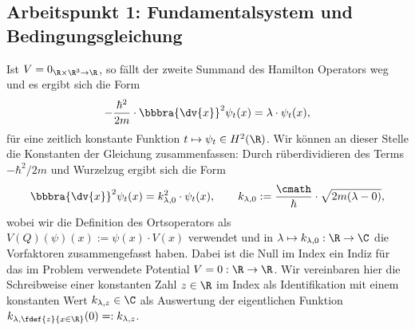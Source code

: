 \documentclass{subfiles}
\begin{document}
    \subsection{Arbeitspunkt 1: Fundamentalsystem und Bedingungsgleichung}
        Ist $V = 0_{\R\times\R^3\to\R}$, so fällt der zweite Summand des Hamilton Operators weg und es ergibt sich die Form
        \[
            -\frac{\hbar^2}{2m}\cdot\bbbra{\dv{x}}^2\psi_t(x) = \lambda\cdot\psi_t(x),
        \]
        für eine zeitlich konstante Funktion $t\mapsto \psi_t\in H^2(\R)$. 
        Wir können an dieser Stelle die Konstanten der Gleichung zusammenfassen: Durch rüberdividieren des Terms $-\hbar^2/2m$ und Wurzelzug ergibt sich die Form
        \[
            \bbbra{\dv{x}}^2\psi_t(x) = k_{\lambda,0}^2\cdot \psi_t(x),\qquad k_{\lambda,0}:=\frac{\cmath}{\hbar}\cdot\sqrt{2m(\lambda - 0)},
        \]
        wobei wir die Definition des Ortsoperators als $V(Q)(\psi)(x) := \psi(x)\cdot V(x)$ verwendet und in $\lambda\mapsto k_{\lambda,0}:\R\to\C$ die Vorfaktoren zusammengefasst haben. Dabei ist die Null im Index ein Indiz für das im Problem verwendete Potential $V = 0:\R\to\R$. Wir vereinbaren hier die Schreibweise einer konstanten Zahl $z\in\R$ im Index als Identifikation mit einem konstanten Wert $k_{\lambda,z}\in\C$ als Auswertung der eigentlichen Funktion $k_{\lambda,\fdef{z}{x\in\R}}(0) =: k_{\lambda,z}$. 
\end{document}

